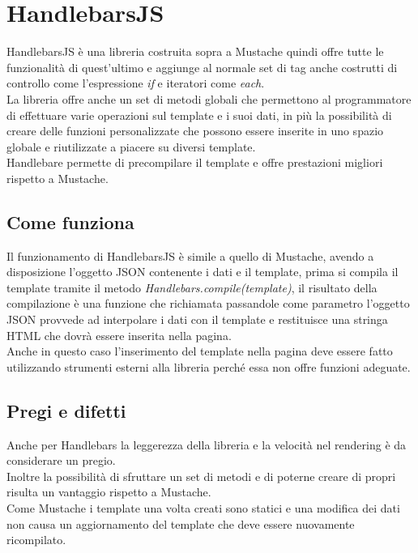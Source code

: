 \FloatBarrier
\section{HandlebarsJS}
HandlebarsJS è una libreria costruita sopra a Mustache quindi offre tutte le funzionalità di quest'ultimo e aggiunge al normale set di tag anche costrutti di controllo come l'espressione \textit{if} e iteratori come \textit{each}.\\
La libreria offre anche un set di metodi globali che permettono al programmatore di effettuare varie operazioni sul template e i suoi dati, in più la possibilità di creare delle funzioni personalizzate che possono essere inserite in uno spazio globale e riutilizzate a piacere su diversi template.\\
Handlebare permette di precompilare il template e offre prestazioni migliori rispetto a Mustache.
\subsection{Come funziona}
Il funzionamento di HandlebarsJS è simile a quello di Mustache, avendo a disposizione l'oggetto JSON contenente i dati e il template, prima si compila il template tramite il metodo \textit{Handlebars.compile(template)}, il risultato della compilazione è una funzione che richiamata passandole come parametro l'oggetto JSON provvede ad interpolare i dati con il template e restituisce una stringa HTML che dovrà essere inserita nella pagina.\\
Anche in questo caso l'inserimento del template nella pagina deve essere fatto utilizzando strumenti esterni alla libreria perché essa non offre funzioni adeguate.

\subsection{Pregi e difetti}
Anche per Handlebars la leggerezza della libreria e la velocità nel rendering è da considerare un pregio.\\
Inoltre la possibilità di sfruttare un set di metodi e di poterne creare di propri risulta un vantaggio rispetto a Mustache.\\
Come Mustache i template una volta creati sono statici e una modifica dei dati non causa un aggiornamento del template che deve essere nuovamente ricompilato.

\FloatBarrier
